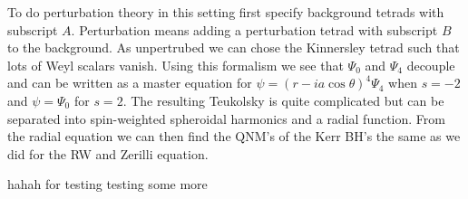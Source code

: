 \documentclass[12 pt]{article}
\begin{document}
To do perturbation theory in this setting first specify background tetrads with subscript $A$. Perturbation means adding a perturbation tetrad with subscript $B$ to the background.  As unpertrubed we can chose the Kinnersley tetrad such that lots of Weyl scalars vanish. Using this formalism we see that $\Psi_0$ and $\Psi_4$ decouple and can be written as a master equation for $\psi = (r-ia\cos \theta )^4 \Psi_4$ when $s= -2$ and $\psi = \Psi_0$ for $s=2$. 
The resulting Teukolsky is quite complicated but can be separated into spin-weighted spheroidal harmonics and a radial function. From the radial equation we can then find the QNM's of the Kerr BH's the same as we did for the RW and Zerilli equation. 



hahah for testing testing some more


















\cite{dataAnalysis}


\end{document}
